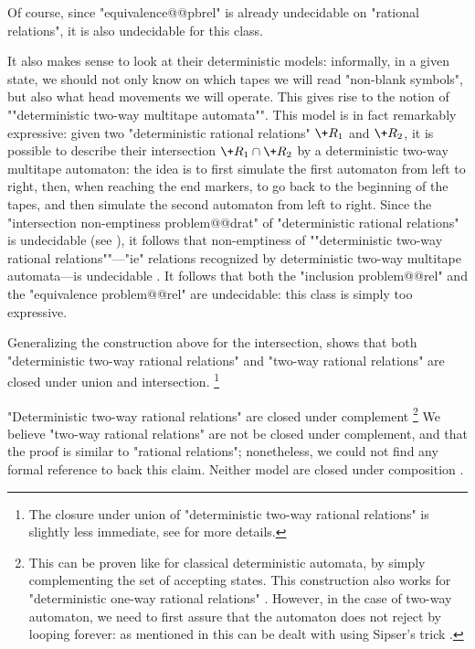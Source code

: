 Of course, since "equivalence@@pbrel" is already undecidable on "rational relations", it is also
undecidable for this class.

It also makes sense to look at their deterministic models: informally, in a given state, we
should not only know on which tapes we will read "non-blank symbols",
but also what head movements we will operate.
This gives rise to the notion of \AP""deterministic two-way multitape automata"".
This model is in fact remarkably expressive: given two "deterministic rational relations"
$\+R_1$ and $\+R_2$, it is possible to describe their intersection $\+R_1 \cap \+R_2$
by a deterministic two-way multitape automaton: the idea is to first simulate the first automaton
from left to right, then, when reaching the end markers, to go back to the beginning of the tapes,
and then simulate the second automaton from left to right.
Since the "intersection non-emptiness problem@@drat"
of "deterministic rational relations" is undecidable (see ),
it follows that non-emptiness of \AP""deterministic two-way rational relations""---"ie"
relations recognized by deterministic two-way multitape automata---is undecidable
\cite[Theorem~19]{RabinScott1959FiniteAutomata}.
It follows that both the "inclusion problem@@rel" and the "equivalence problem@@rel" are
undecidable: this class is simply too expressive.

Generalizing the construction above for the intersection, shows that
both "deterministic two-way rational relations" and "two-way rational relations"
are closed under union and intersection.%
\footnote{The closure under union of "deterministic two-way rational relations"
is slightly less immediate, see \cite[Lemma~4]{CartonExibardSerre2017TwoWayTwoTapeAutomata}
for more details.}

"Deterministic two-way rational relations" are closed under complement%
\footnote{This can be proven like for classical deterministic automata, by simply complementing
the set of accepting states. This construction also works
for "deterministic one-way rational relations" \cite[Theorem~17]{RabinScott1959FiniteAutomata}.
However, in the case of two-way automaton,
we need to first assure that the automaton does not reject by looping
forever: as mentioned in \cite[Lemma~4]{CartonExibardSerre2017TwoWayTwoTapeAutomata}
this can be dealt with using Sipser's trick \cite[Theorem~1]{Sipser1980HaltingSpaceBoundedComputations}.}
We believe "two-way rational relations" are not be closed under complement,
and that the proof is similar to "rational relations"; nonetheless, we could not find
any formal reference to back this claim.
Neither model are closed under composition \cite[Theorem~5]{CartonExibardSerre2017TwoWayTwoTapeAutomata}.

